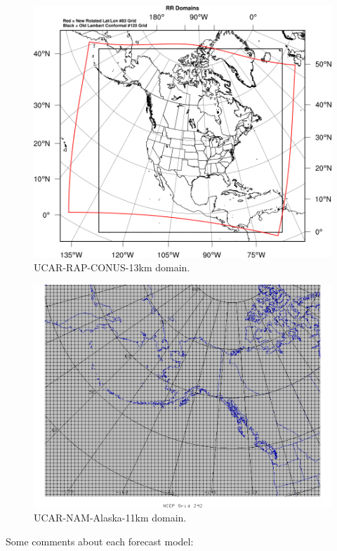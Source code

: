 \documentclass[12pt]{article}
\begin{document}
\begin{figure}[H]
	\centering
	\label{RAP_CONUS}
	\includegraphics[scale=0.35]{UCAR_RAP_domain}
	\caption*{UCAR-RAP-CONUS-13km domain.}
\end{figure}
\begin{figure}[H]
	\centering
	\label{RAP_CONUS}
	\includegraphics[scale=0.30]{NAM_2}
	\caption*{UCAR-NAM-Alaska-11km domain.}
\end{figure}
Some comments about each forecast model:
\end{document}
